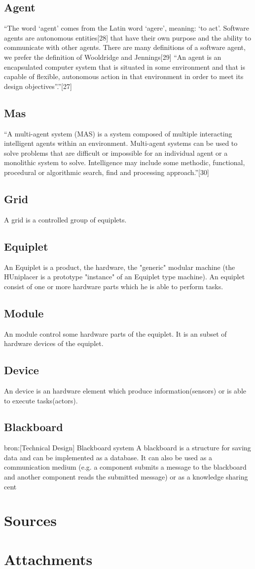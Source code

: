 \documentclass[12pt,a4paper]{report}
\begin{document}
\section{Agent}
“The word ‘agent’ comes from the Latin word ‘agere’, meaning: ‘to act’. Software agents are autonomous entities[28] that have their own purpose and the ability to communicate with other agents. There are many definitions of a software agent, we prefer the definition of Wooldridge and Jennings[29] “An agent is an encapsulated computer system that is situated in some environment and that is capable of flexible, autonomous action in that environment in
order to meet its design objectives”.”[27]
\section{Mas}
“A multi-agent system (MAS) is a system composed of multiple interacting intelligent agents within an environment. Multi-agent systems can be used to solve problems that are difficult or impossible for an individual agent or a monolithic system to solve. Intelligence may include some methodic, functional, procedural or algorithmic search, find and processing approach.”[30]
\section{Grid}
A grid is a controlled group of equiplets.
\section{Equiplet}
An Equiplet is a product, the hardware, the "generic" modular machine (the HUniplacer is a prototype "instance" of an Equiplet type machine). An equiplet consist of one or more hardware parts which he is able to perform tasks.
\section{Module}
An module control some hardware parts of the equiplet. It is an subset of hardware devices of the equiplet.
\section{Device}
An device is an hardware element which produce information(sensors) or is able to execute tasks(actors).
\section{Blackboard}
bron:[Technical Design] Blackboard system
A blackboard is a structure for saving data and can be implemented as a database. It can also be used as a communication medium (e.g. a component submits a message to the blackboard and another component reads the submitted message) or as a knowledge sharing cent

\chapter{Sources}

\chapter{Attachments}



\end{document}
